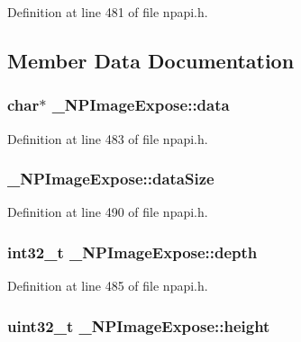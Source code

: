 Definition at line 481 of file npapi.h.



\subsection{Member Data Documentation}
\hypertarget{struct___n_p_image_expose_a4261d6867119c1ffe0bd4fe44cbaa4d0}{
\subsubsection[{data}]{\setlength{\rightskip}{0pt plus 5cm}char$\ast$ {\bf \_\-NPImageExpose::data}}}
\label{struct___n_p_image_expose_a4261d6867119c1ffe0bd4fe44cbaa4d0}


Definition at line 483 of file npapi.h.

\hypertarget{struct___n_p_image_expose_a38e94219212019a5e5f3fb87b6634e82}{
\subsubsection[{dataSize}]{ {\bf \_\-NPImageExpose::dataSize}}}
\label{struct___n_p_image_expose_a38e94219212019a5e5f3fb87b6634e82}


Definition at line 490 of file npapi.h.

\hypertarget{struct___n_p_image_expose_aaef2311fadc6309c258e045087706697}{
\subsubsection[{depth}]{\setlength{\rightskip}{0pt plus 5cm}int32\_\-t {\bf \_\-NPImageExpose::depth}}}
\label{struct___n_p_image_expose_aaef2311fadc6309c258e045087706697}


Definition at line 485 of file npapi.h.

\hypertarget{struct___n_p_image_expose_a6f672c7697b1e6a029278bacacd7936a}{
\subsubsection[{height}]{\setlength{\rightskip}{0pt plus 5cm}uint32\_\-t {\bf \_\-NPImageExpose::height}}}
\label{struct___n_p_image_expose_a6f672c7697b1e6a029278bacacd7936a}


